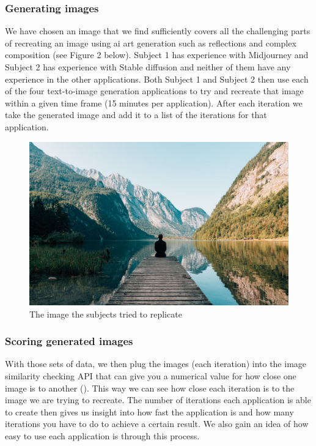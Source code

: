 \documentclass[]{report}
\begin{document}
	
	\subsubsection{Generating images}
	
	We have chosen an image that we find sufficiently covers all the challenging parts of recreating an image using ai art generation such as reflections and complex composition (see Figure 2 below).
	Subject 1 has experience with Midjourney and Subject 2 has experience with Stable diffusion and neither of them have any experience in the other applications. Both Subject 1 and Subject 2 then use each of the four text-to-image generation applications to try and recreate that image within a given time frame (15 minutes per application). After each iteration we take the generated image and add it to a list of the iterations for that application. 
	
	\begin{figure}[!h]
		\centering
		\includegraphics[width=1\linewidth]{OG}
		\caption{The image the subjects tried to replicate}
		\label{fig:og}
	\end{figure}
	
	\subsubsection{Scoring generated images}
	With those sets of data, we then plug the images (each iteration) into the image similarity checking API that can give you a numerical value for how close one image is to another (\cite{imageSimilarity}). This way we can see how close each iteration is to the image we are trying to recreate. The number of iterations each application is able to create then gives us insight into how fast the application is and how many iterations you have to do to achieve a certain result. We also gain an idea of how easy to use each application is through this process.
	
\end{document}
